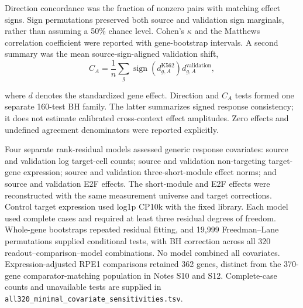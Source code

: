 \documentclass[a4paper,fleqn]{cas-sc}
\makeatletter
\DeclareRobustCommand{\rev}[1]{{\color{red}\def\@citecolor{black}\def\@linkcolor{red}\def\@urlcolor{red}#1}}
\makeatother
\begin{document}
\rev{Direction concordance was the fraction of nonzero pairs with matching effect signs.} \rev{Sign permutations preserved both source and validation sign marginals, rather than assuming a 50\% chance level.} \rev{Cohen's $\kappa$ and the Matthews correlation coefficient were reported with gene-bootstrap intervals.} \rev{A second summary was the mean source-sign-aligned validation shift,
{}
{}
{\color{red}
\[
 C_A=\frac{1}{n}\sum_g
 \operatorname{sign}\!\left(d_{g,A}^{\mathrm{K562}}\right)
 d_{g,A}^{\mathrm{validation}},
\]
}
}

\rev{where $d$ denotes the standardized gene effect.} \rev{Direction and $C_A$ tests formed one separate 160-test BH family.} \rev{The latter summarizes signed response consistency; it does not estimate calibrated cross-context effect amplitudes.} \rev{Zero effects and undefined agreement denominators were reported explicitly.}

\rev{Four separate rank-residual models assessed generic response covariates: source and validation log target-cell counts; source and validation non-targeting target-gene expression; source and validation three-short-module effect norms; and source and validation E2F effects.} \rev{The short-module and E2F effects were reconstructed with the same measurement universe and target corrections.} \rev{Control target expression used log1p CP10k with the fixed library.} \rev{Each model used complete cases and required at least three residual degrees of freedom.} \rev{Whole-gene bootstraps repeated residual fitting, and 19,999 Freedman--Lane permutations supplied conditional tests, with BH correction across all 320 readout--comparison--model combinations.} \rev{No model combined all covariates.} \rev{Expression-adjusted RPE1 comparisons retained 362 genes, distinct from the 370-gene comparator-matching population in Notes S10 and S12.} \rev{Complete-case counts and unavailable tests are supplied in \nolinkurl{all320_minimal_covariate_sensitivities.tsv}.}
\end{document}
